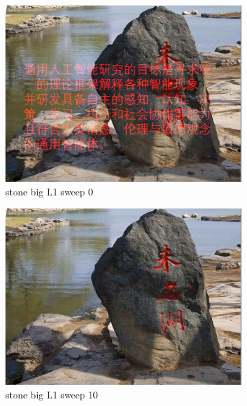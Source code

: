 \documentclass[11pt]{article}
\begin{document}
\begin{figure}[ht!]
    \centering
    \hfill%
    \begin{subfigure}[]{0.333\linewidth}
        \centering
        \includegraphics[width=\linewidth]{fig/restoration/stone_big/L1/gibbs_0.jpg}
        \caption{stone big L1 sweep 0}
    \end{subfigure}%
    \hfill%
    \begin{subfigure}[]{0.333\linewidth}
        \centering
        \includegraphics[width=\linewidth]{fig/restoration/stone_big/L1/gibbs_10.jpg}
        \caption{stone big L1 sweep 10}
    \end{subfigure}%
    \hfill%
    \begin{subfigure}[]{0.333\linewidth}

\end{subfigure}
\end{figure}
\end{document}
